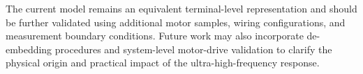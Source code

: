 \documentclass[12pt,a4paper]{article}
\begin{document}
The current model remains an equivalent terminal-level representation and should be further validated using additional motor samples, wiring configurations, and measurement boundary conditions. Future work may also incorporate de-embedding procedures and system-level motor-drive validation to clarify the physical origin and practical impact of the ultra-high-frequency response.

\clearpage
{}


\end{document}
